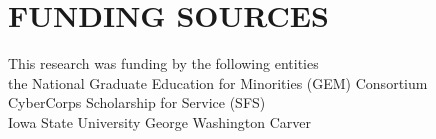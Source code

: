 \chapter*{ FUNDING SOURCES }

This research was funding by the following entities\\
the National Graduate Education for Minorities (GEM) Consortium\\
CyberCorps Scholarship for Service (SFS) \\
Iowa State University George Washington Carver \\